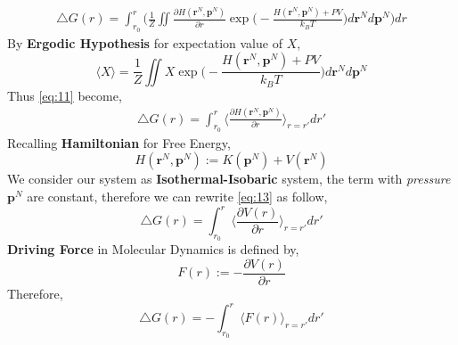 \documentclass[a4paper,9pt]{article}
\begin{document}
\begin{enumerate}
\begin{equation}
		\begin{aligned}
		\triangle G(r) = \int_{r_0}^{r} \bigg( \frac{1}{Z} \iint \frac{\partial H(\textbf{r}^N,\textbf{p}^N)}{\partial r} \exp\bigg(-\frac{H(\textbf{r}^N,\textbf{p}^N) + PV}{k_B T}\bigg)d\textbf{r}^N d\textbf{p}^N \bigg) dr
		\end{aligned}
		\end{equation}
		By \textbf{Ergodic Hypothesis} for expectation value of $X$,
		\begin{equation}\label{eq:12}
		\langle X \rangle = \frac{1}{Z} \iint X \exp\bigg(-\frac{H(\textbf{r}^N,\textbf{p}^N) + PV}{k_B T}\bigg)d\textbf{r}^N d\textbf{p}^N
		\end{equation}
		Thus \eqref{eq:11} become,
		\begin{equation}\label{eq:13}
		\begin{aligned}
		\triangle G(r) = \int_{r_0}^{r} \bigg\langle \frac{\partial H(\textbf{r}^N,\textbf{p}^N)}{\partial r} \bigg\rangle_{r=r'} dr'
		\end{aligned}
		\end{equation}
		Recalling \textbf{Hamiltonian} for Free Energy,
		\begin{equation}\label{eq:14}
		H(\textbf{r}^N,\textbf{p}^N) := K(\textbf{p}^N) + V(\textbf{r}^N)
		\end{equation}
		We consider our system as \textbf{Isothermal-Isobaric} system, the term with \textit{pressure} $\textbf{p}^N$ are constant, therefore we can rewrite \eqref{eq:13} as follow,
		\begin{equation}\label{eq:15}
		\triangle G(r) = \int_{r_0}^{r} \bigg\langle \frac{\partial V(r)}{\partial r} \bigg\rangle_{r=r'} dr'
		\end{equation}
		\textbf{Driving Force} in Molecular Dynamics is defined by,
		\begin{equation}\label{eq:16}
		F(r) := -\frac{\partial V(r)}{\partial r}
		\end{equation}
		Therefore,
		$$\triangle G(r) = -\int_{r_0}^{r} \langle F(r) \rangle_{r=r'} dr'$$
\end{enumerate}
\end{document}
